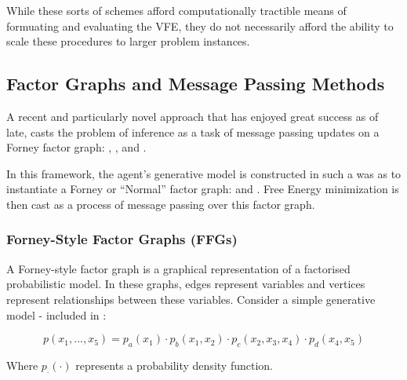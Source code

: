 \documentclass[onecolumn]{IEEEtran}
\begin{document}
While these sorts of schemes afford computationally tractible means of formuating and evaluating the VFE, they do not necessarily afford the ability to scale these procedures to larger problem instances.


\subsection{Factor Graphs and Message Passing Methods}

A recent and particularly novel approach that has enjoyed great success as of late, casts the problem of inference as a task of message passing updates on a Forney factor graph: \textcite{Factor-Graph-Approach-Automated-Design-Bayesian-Algos}, \textcite{Simulating-AIF-By-Message-Passing}, \textcite{Factor-Graph-Desc-Deep-Temp-AIF} and \textcite{Reactive-MP}. 

In this framework, the agent's generative model is constructed in such a was as to instantiate a Forney or ``Normal'' factor graph: \textcite{Codes-on-Graphs} and \textcite{Intro-to-Factor-Graphs}. Free Energy minimization is then cast as a process of message passing over this factor graph. 

\vspace{12pt}
\subsubsection{Forney-Style Factor Graphs (FFGs)}
A Forney-style factor graph is a graphical representation of a factorised probabilistic model. In these graphs, edges represent variables and vertices represent relationships between these variables. Consider a simple generative model - included in \textcite{Factor-Graph-Approach-Automated-Design-Bayesian-Algos}:


\begin{equation}
p(x_1, ..., x_5) = p_a(x_1) \cdot p_b(x_1, x_2) \cdot p_c(x_2, x_3, x_4) \cdot p_d(x_4, x_5) \label{eq:factorized-model}
\end{equation}

Where $p_\cdot(\cdot)$ represents a probability density function.
\end{document}

